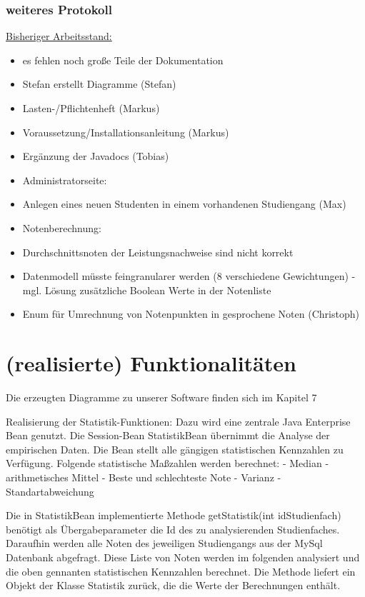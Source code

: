 \documentclass[12pt,a4paper,parskip]{scrreprt}
\begin{document}
\subsection{weiteres Protokoll}
\underline{Bisheriger Arbeitsstand:}
\begin{itemize}
	\item es fehlen noch große Teile der Dokumentation
\item Stefan erstellt Diagramme (Stefan)
\item Lasten-/Pflichtenheft (Markus)
\item Voraussetzung/Installationsanleitung (Markus)
\item Ergänzung der Javadocs (Tobias)
\item Administratorseite:
\item Anlegen eines neuen Studenten in einem vorhandenen Studiengang (Max)
\item Notenberechnung:
\item Durchschnittsnoten der Leistungsnachweise sind nicht korrekt
\item Datenmodell müsste feingranularer werden (8 verschiedene Gewichtungen)			- mgl. Lösung zusätzliche Boolean Werte in der Notenliste
\item Enum für Umrechnung von Notenpunkten in gesprochene Noten (Christoph)
\end{itemize}
\chapter{(realisierte) Funktionalitäten}
Die erzeugten Diagramme zu unserer Software finden sich im Kapitel 7

Realisierung der Statistik-Funktionen:
Dazu wird eine zentrale Java Enterprise Bean genutzt. Die Session-Bean StatistikBean übernimmt die Analyse der empirischen Daten. Die Bean stellt alle gängigen statistischen Kennzahlen zu Verfügung.
Folgende statistische Maßzahlen werden berechnet:
- Median
- arithmetisches Mittel
- Beste und schlechteste Note
- Varianz
- Standartabweichung

Die in StatistikBean implementierte Methode getStatistik(int idStudienfach) benötigt als Übergabeparameter die Id des zu analysierenden Studienfaches. Daraufhin werden alle Noten des jeweiligen Studiengangs aus der MySql Datenbank abgefragt. Diese Liste von Noten werden im folgenden analysiert und die oben gennanten statistischen Kennzahlen berechnet. Die Methode liefert ein Objekt der Klasse Statistik zurück, die die Werte der Berechnungen enthält.
\end{document}
